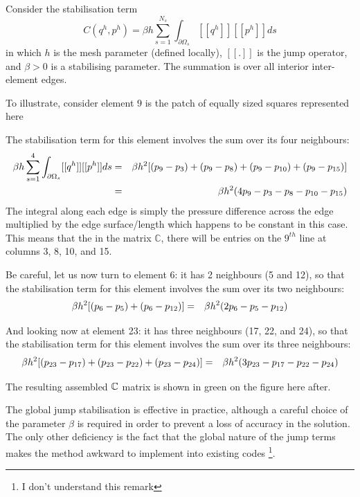 Consider the stabilisation term
\[
C(q^h,p^h) = \beta h \sum_{s=1}^{N_s} \int_{\partial \Omega_s}[[ q^h ]]  [[p^h ]] ds
\]
in which $h$ is the mesh parameter (defined locally), $[[.]]$ is the jump operator,
and $\beta>0$ is a stabilising parameter. 
The summation is over all interior inter-element edges.

To illustrate, consider element $9$ is the patch of equally  sized
squares represented here

\begin{center}

\end{center}

The stabilisation term for this element involves the sum over its four neighbours:
\begin{eqnarray}
\beta h \sum_{s=1}^{4} \int_{\partial \Omega_s}[[ q^h ]]  [[p^h ]] ds
&=& \beta h^2 [ (p_9-p_3)+(p_9-p_8)+(p_9-p_{10})+(p_9-p_{15})   ]  \nonumber\\
&=& \beta h^2 ( 4 p_9-p_3 -p_8-p_{10} -p_{15})  \nonumber
\end{eqnarray}
The integral along each edge is simply the pressure difference across the edge 
multiplied by the edge surface/length which happens to be constant in this case.
This means that the in the matrix $\mathbb{C}$, there will be entries on the $9^{th}$
line at columns 3, 8, 10, and 15. 

Be careful, let us now turn to element 6: it has 2 neighbours (5 and 12), so that
the stabilisation term for this element involves the sum over its two neighbours:
\begin{eqnarray}
 \beta h^2 [ (p_6-p_5)+(p_6-p_{12})  ]  
&=& \beta h^2 ( 2 p_6-p_5 -p_{12} )  \nonumber
\end{eqnarray}

And looking now at element 23: it has three neighbours (17, 22, and 24), so that 
the stabilisation term for this element involves the sum over its three neighbours:
\begin{eqnarray}
\beta h^2 [ (p_{23}-p_{17})+(p_{23}-p_{22}) +(p_{23}-p_{24})  ] 
&=& \beta h^2 ( 3 p_{23}-p_{17} -p_{22} - p_{24} )  \nonumber
\end{eqnarray}


The resulting assembled ${\mathbb{C}}$ matrix is shown in green on the figure here after.

The global jump stabilisation is effective in
practice, although a careful choice of the parameter $\beta$
is required in order to prevent a loss of accuracy in the solution.
The only other deficiency is the fact that the global nature of the jump terms makes the method awkward to implement into existing codes
\footnote{I don't understand this remark}.\cite{sike90}

